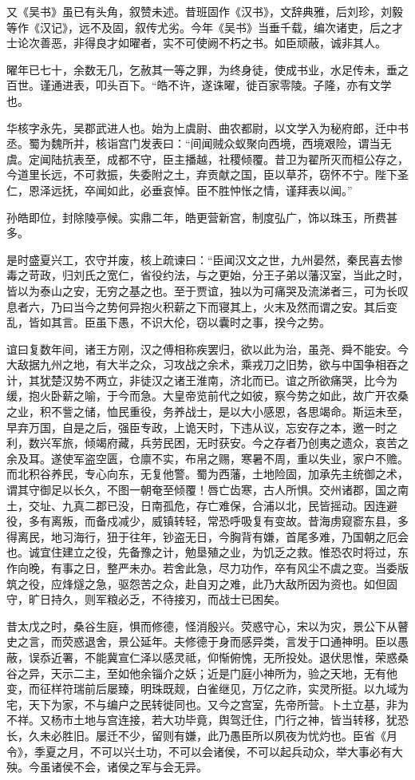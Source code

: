 \documentclass[12pt,UTF8]{ctexbook}
\begin{document}
又《吴书》虽已有头角，叙赞未述。昔班固作《汉书》，文辞典雅，后刘珍，刘毅等作《汉记》，远不及固，叙传尤劣。今年《吴书》当垂千载，编次诸吏，后之才士论次善恶，非得良才如曜者，实不可使阙不朽之书。如臣顽蔽，诚非其人。

曜年已七十，余数无几，乞赦其一等之罪，为终身徒，使成书业，水足传未，垂之百世。谨通进表，叩头百下。“皓不许，遂诛曜，徙百家零陵。子隆，亦有文学也。

华核字永先，吴郡武进人也。始为上虞尉、曲农都尉，以文学入为秘府郎，迁中书丞。蜀为魏所并，核诣宫门发表曰：“间闻贼众蚁聚向西境，西境艰险，谓当无虞。定闻陆抗表至，成都不守，臣主播越，社稷倾覆。昔卫为翟所灭而桓公存之，今道里长远，不可救振，失委附之土，弃贡献之国，臣以草芥，窃怀不宁。陛下圣仁，恩泽远抚，卒闻如此，必垂哀悼。臣不胜忡怅之情，谨拜表以闻。”

孙皓即位，封除陵亭候。实鼎二年，皓更营新宫，制度弘广，饰以珠玉，所费甚多。

是时盛夏兴工，农守并废，核上疏谏曰：“臣闻汉文之世，九州晏然，秦民喜去惨毒之苛政，归刘氏之宽仁，省役约法，与之更始，分王子弟以藩汉室，当此之时，皆以为泰山之安，无穷之基之也。至于贾谊，独以为可痛哭及流涕者三，可为长叹息者六，乃曰当今之势何异抱火积薪之下而寝其上，火末及然而谓之安。其后变乱，皆如其言。臣虽下愚，不识大伦，窃以囊时之事，揆今之势。

谊曰复数年间，诸王方刚，汉之傅相称疾罢归，欲以此为治，虽尧、舜不能安。今大敌据九州之地，有大半之众，习攻战之余术，乘戎刀之旧势，欲与中国争相吞之计，其犹楚汉势不两立，非徒汉之诸王淮南，济北而已。谊之所欲痛哭，比今为缓，抱火卧薪之喻，于今而急。大皇帝览前代之如彼，察今势之如此，故广开农桑之业，积不訾之储，恤民重役，务养战士，是以大小感恩，各思竭命。斯运未至，早弃万国，自是之后，强臣专政，上诡天时，下违从议，忘安存之本，邀一时之利，数兴军旅，倾竭府藏，兵劳民困，无时获安。今之存者乃创夷之遗众，哀苦之余及耳。遂使军盗空匮，仓廪不实，布帛之赐，寒暑不周，重以失业，家户不赡。而北积谷养民，专心向东，无复他警。蜀为西藩，土地险固，加承先主统御之术，谓其守御足以长久，不图一朝奄至倾覆！唇亡齿寒，古人所惧。交州诸郡，国之南土，交址、九真二郡已没，日南孤危，存亡难保，合浦以北，民皆摇动。因连避役，多有离叛，而备戍减少，威镇转轻，常恐呼吸复有变故。昔海虏窥窬东县，多得离民，地习海行，狃于往年，钞盗无日，今胸背有嫌，首尾多难，乃国朝之厄会也。诚宜住建立之役，先备豫之计，勉垦殖之业，为饥乏之救。惟恐农时将过，东作向晚，有事之日，整严未办。若舍此急，尽力功作，卒有风尘不虞之变。当委版筑之役，应烽燧之急，驱怨苦之众，赴自刃之难，此乃大敌所因为资也。如但固守，旷日持久，则军粮必乏，不待接刃，而战士已困矣。

昔太戊之时，桑谷生庭，惧而修德，怪消殷兴。荧惑守心，宋以为灾，景公下从瞽史之言，而荧惑退舍，景公延年。夫修德于身而感异类，言发于口通神明。臣以愚蔽，误忝近署，不能冀宣仁泽以感灵祗，仰惭俯愧，无所投处。退伏思惟，荣惑桑谷之异，天示二主，至如他余锱介之妖；近是门庭小神所为，验之天地，无有他变，而征样符瑞前后屡臻，明珠既觌，白雀继见，万亿之祚，实灵所挺。以九域为宅，天下为家，不与编户之民转徙同也。又今之宫室，先帝所营。卜土立基，非为不祥。又杨市土地与宫连接，若大功毕竟，舆驾迁住，门行之神，皆当转移，犹恐长，久未必胜旧。屡迁不少，留则有嫌，此乃愚臣所以夙夜为忧灼也。臣省《月令》，季夏之月，不可以兴土功，不可以会诸侯，不可以起兵动众，举大事必有大殃。今虽诸侯不会，诸侯之军与会无异。
\end{document}
